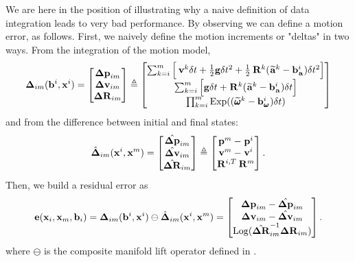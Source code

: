 We are here in the position of illustrating why a naive definition of data integration leads to very bad performance. 
By observing  we can define a motion error, as follows. 
First, we naively define the motion increments or "deltas"
%
%
in two ways. 
From the integration of the motion model, %
%
\begin{align}
    {{\bm \Delta}}_{im}({\bf b}^i, {\bf x}^i) = 
    \begin{bmatrix}
    {\bm \Delta {\bf p}}_{im}\\ {\bm \Delta {\bf v}}_{im}\\ {\bm \Delta {\bf R}}_{im}
    \end{bmatrix} \triangleq
    \begin{bmatrix}
    \sum_{k=i}^{m} \Big[\prescript{}{}{{\bf v}}_{}^{k}\delta t + \frac{1}{2}{\bf g} \delta t^2 
    + \frac{1}{2}\prescript{}{}{{\bf R}}_{}^{k}(\prescript{}{}{\widetilde{{\bf a}}}_{}^k - {\bf b}_{\prescript{}{}{{\bf a}}_{}}^i)\delta t^2 \Big] \\
    \sum_{k=i}^{m} \Big[{\bf g} \delta t + \prescript{}{}{{\bf R}}_{}^{k}(\prescript{}{}{\widetilde{{\bf a}}}_{}^k - {\bf b}_{\prescript{}{}{{\bf a}}_{}}^i)\delta t \Big]  \\
    \prod_{k=i}^{m} \operatorname*{Exp}((\prescript{}{}{\widetilde{\pmb{\omega}}}_{}^k - {\bf b}_{\prescript{}{}{\pmb{\omega}}_{}}^i)\delta t)  
    \end{bmatrix}
    \label{eq:imu_delta_forster_naive}
\end{align}
%
and from the difference between initial and final states:
%
\begin{align}
    \hat{{{\bm \Delta}}}_{im}({\bf x}^i, {\bf x}^m) = 
    \begin{bmatrix}
    \hat{{\bm \Delta {\bf p}}}_{im}\\ \hat{{\bm \Delta {\bf v}}}_{im}\\ \hat{{\bm \Delta {\bf R}}}_{im}
    \end{bmatrix} \triangleq
    \begin{bmatrix}
    \prescript{}{}{{\bf p}}_{}^{m} - \prescript{}{}{{\bf p}}_{}^{i} \\
    \prescript{}{}{{\bf v}}_{}^{m}  - \prescript{}{}{{\bf v}}_{}^{i}  \\
    \prescript{}{}{{\bf R}}_{}^{i,T} \prescript{}{}{{\bf R}}_{}^{m}  
    \end{bmatrix}.
\end{align}
%
Then, we build a residual error as
%
\begin{equation}
    {\bf e}({\bf x}_i, {\bf x}_m, {\bf b}_i) 
    = {{\bm \Delta}}_{im}({\bf b}^i, {\bf x}^i) \ominus \hat{{{\bm \Delta}}}_{im}({\bf x}^i, {\bf x}^m) =
    \begin{bmatrix}
    {\bm \Delta {\bf p}}_{im} - \hat{{\bm \Delta {\bf p}}}_{im} \\ 
    {\bm \Delta {\bf v}}_{im} - \hat{{\bm \Delta {\bf v}}}_{im} \\ 
    \operatorname*{Log}(\hat{{\bm \Delta {\bf R}}}_{im}^{-1} {\bm \Delta {\bf R}}_{im}) 
    \end{bmatrix}.
    \label{eq:error_naive_pre-integration}
\end{equation}
%
where $\ominus$ is the composite manifold lift operator defined in .

